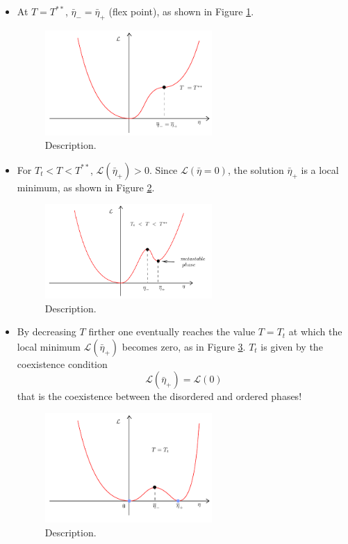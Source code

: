 \documentclass[../main/main.tex]{subfiles}
\begin{document}
\begin{itemize}
\begin{itemize}
\item At \( T = T^{**}\), \( \bar{\eta }_- = \bar{\eta }_+   \) (flex point), as shown in Figure \ref{fig:16_2}.
\begin{figure}[h!]
\centering
\includegraphics[width=0.6\textwidth]{../lessons/16_image/2.pdf}
\caption{\label{fig:16_2} Description.}
\end{figure}
\item For \( T_t < T < T^{**} \), \( \mathcal{L} (\bar{\eta }_+) >0  \). Since \( \mathcal{L} (\bar{\eta }=0 ) \), the solution \( \bar{\eta }_+  \) is a local minimum, as shown in Figure \ref{fig:16_3}.
\begin{figure}[h!]
\centering
\includegraphics[width=0.6\textwidth]{../lessons/16_image/3.pdf}
\caption{\label{fig:16_3} Description.}
\end{figure}
\item By decreasing \( T \) firther one eventually reaches the value \( T=T_t \) at which the local minimum \( \mathcal{L} (\bar{\eta }_+ ) \) becomes zero, as in Figure \ref{fig:16_4}. \( T_t \)  is given by the coexistence condition
\begin{equation}
  \mathcal{L} (\bar{\eta }_+ ) = \mathcal{L} (0)
\end{equation}
that is the coexistence between the disordered and ordered phases!
\begin{figure}[h!]
\centering
\includegraphics[width=0.6\textwidth]{../lessons/16_image/4.pdf}
\caption{\label{fig:16_4} Description.}
\end{figure}


\end{itemize}
\end{itemize}
\end{document}

